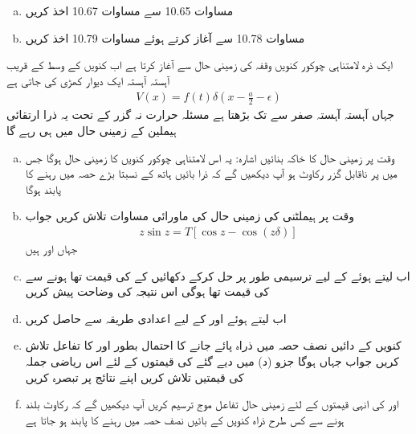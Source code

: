 \begin{enumerate}[a.]
\item
مساوات 10.65 سے مساوات 10.67 اخذ کریں 
\item
مساوات 10.78 سے آغاز کرتے ہوئے مساوات 10.79 اخذ کریں 
\end{enumerate}
ایک ذرہ لامتناہی چوکور کنویں وقفہ  کی زمینی حال سے آغاز کرتا ہے اب کنویں کے وسط کے قریب آہستہ آہستہ ایک دیوار کھڑی کی جاتی ہے 
\begin{align*}
V (x) = f (t) \delta (x - \frac{a}{2} - \epsilon)
\end{align*}
جہاں  آہستہ آہستہ صفر سے  تک بڑھتا ہے مسئلہ حرارت نہ گزر کے تحت یہ ذرا ارتقائی ہیملین کے زمینی حال میں ہی رہے گا 
\begin{enumerate}[a.]
\item
وقت  پر زمینی حال کا خاکہ بنائیں اشارہ: یہ اس لامتناہی چوکور کنویں کا زمینی حال ہوگا جس میں  پر ناقابل گزر رکاوٹ ہو آپ دیکھیں گے کہ ذرا بائیں ہاتھ کے نسبتا بڑے حصہ میں رہنے کا پابند ہوگا 
\item
وقت  پر ہیملٹنی کی زمینی حال کی ماورائی مساوات تلاش کریں جواب 
\begin{align*}
z \sin z = T [\cos z - \cos (z \delta)]
\end{align*}
جہاں    اور  ہیں 
\item
اب  لیتے ہوئے  کے لیے ترسیمی طور پر حل کرکے دکھائیں کے  کی قیمت  تھا  ہونے سے  کی قیمت  تھا  ہوگی اس نتیجہ کی وضاحت پیش کریں 
\item 
اب  لیتے ہوئے  اور  کے لیے  اعدادی طریقہ سے حاصل کریں 
\item
کنویں کے دائیں نصف حصہ میں ذراہ پائے جانے کا احتمال بطور  اور  کا تفاعل تلاش کریں جواب  جہاں  ہوگا جزو (د) میں دیے گئے  کی قیمتوں کے لئے اس ریاضی جملہ کی قیمتیں تلاش کریں اپنے نتائج پر تبصرہ کریں 
\item
{} اور  کی انہی قیمتوں کے لئے زمینی حال تفاعل موج ترسیم کریں آپ دیکھیں گے کہ رکاوٹ بلند ہونے سے کس طرح ذراہ کنویں کے بائیں نصف حصہ میں رہنے کا پابند ہو جاتا ہے 
\end{enumerate}
